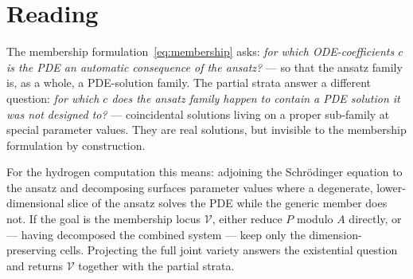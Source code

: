 \documentclass[11pt]{article}
\newcommand{\Var}{\mathcal{V}}
\begin{document}
\section{Reading}

The membership formulation~\eqref{eq:membership} asks: \emph{for which
ODE-coefficients $c$ is the PDE an automatic consequence of the ansatz?} ---
so that the ansatz family is, as a whole, a PDE-solution family. The partial
strata answer a different question: \emph{for which $c$ does the ansatz family
happen to contain a PDE solution it was not designed to?} --- coincidental
solutions living on a proper sub-family at special parameter values. They are
real solutions, but invisible to the membership formulation by construction.

For the hydrogen computation this means: adjoining the Schr\"odinger equation
to the ansatz and decomposing surfaces parameter values where a degenerate,
lower-dimensional slice of the ansatz solves the PDE while the generic member
does not. If the goal is the membership locus $\Var$, either reduce $P$ modulo
$A$ directly, or --- having decomposed the combined system --- keep only the
dimension-preserving cells. Projecting the full joint variety answers the
existential question and returns $\Var$ together with the partial strata.
\end{document}
